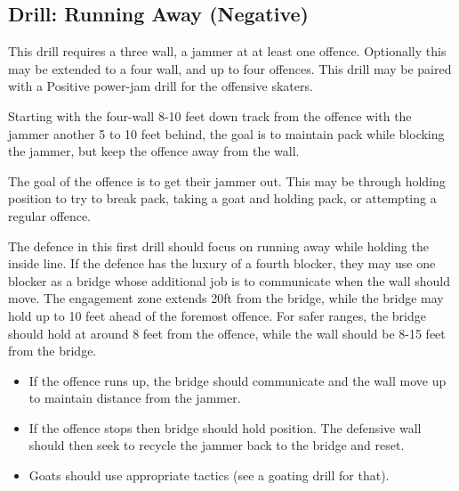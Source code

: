 \subsection*{Drill: Running Away (Negative)}
\label{drill:power_jam/running_away}

This drill requires a three wall, a jammer at at least one offence.
Optionally this may be extended to a four wall, and up to four offences.  
This drill may be paired with a Positive power-jam drill for the offensive skaters. 


Starting with the four-wall 8-10 feet down track from the offence with the jammer another 5 to 10 feet behind, the goal is to maintain pack while blocking the jammer, but keep the offence away from the wall.

The goal of the offence is to get their jammer out.
This may be through holding position to try to break pack, taking a goat and holding pack, or attempting a regular offence. 

The defence in this first drill should focus on running away while holding the inside line.
If the defence has the luxury of a fourth blocker, they may use one blocker as a bridge whose additional job is to communicate when the wall should move.
The engagement zone extends 20ft from the bridge, while the bridge may hold up to 10 feet ahead of the foremost offence.
For safer ranges, the bridge should hold at around 8 feet from the offence, while the wall should be 8-15 feet from the bridge.  


\begin{itemize}
\item If the offence runs up, the bridge should communicate and the wall move up to maintain distance from the jammer.
\item If the offence stops then bridge should hold position. The defensive wall should then seek to recycle the jammer back to the bridge and reset. 
\item Goats should use appropriate tactics (see a goating drill for that).
\end{itemize}



